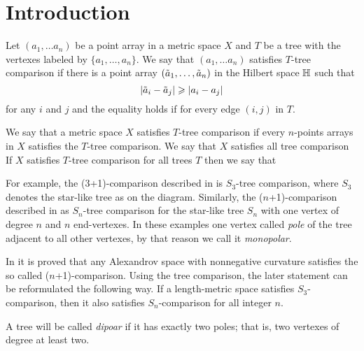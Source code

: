 \section{Introduction}\label{sec:intro}

Let $(a_1,\dots a_n)$ be a point array in a metric space $X$ and $T$ be a 
tree with the vertexes labeled by $\{a_1,\dots,a_n\}$.
We say that $(a_1,\dots a_n)$  satisfies $T$-tree comparison if there is a point array $(\~a_1,\dots, \~a_n)$ in the Hilbert space $\HH$ such that 
\[|\~a_i-\~a_j|\ge|a_i-a_j|\]
for any $i$ and $j$ and the equality holds if for every edge $(i,j)$ in $T$.

We say that a metric space $X$ satisfies $T$-tree comparison if 
every $n$-points arrays in $X$ satisfies the $T$-tree comparison.
We say that  $X$ satisfies all tree comparison
If $X$ satisfies $T$-tree comparison for all trees $T$ then we say that 

\begin{wrapfigure}{r}{20 mm}
\end{wrapfigure}

For example, the (3+1)-comparison described in \cite{AKP} is $S_3$-tree comparison, where $S_3$ denotes the star-like tree as on the diagram.
Similarly, the ($n$+1)-comparison described in \cite{AKP} as $S_n$-tree comparison for the star-like tree $S_n$ with one vertex of degree $n$ and $n$ end-vertexes.
In these examples one vertex called \emph{pole} of the tree adjacent to all other vertexes,
by that reason we call it \emph{monopolar}.

In \cite[4.1]{AKP} it is proved that any Alexandrov space with nonnegative curvature satisfies the so called  ($n$+1)-comparison.
Using the tree comparison, the later statement can be reformulated the following way.
If a length-metric space satisfies $S_3$-comparison, then it also satisfies $S_n$-comparison for all integer $n$.

A tree will be called \emph{dipoar} if it has exactly two poles;
that is, two vertexes of degree at least two.

